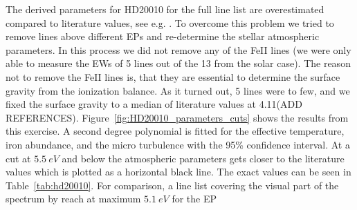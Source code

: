 \documentclass{aa}
\begin{document}
The derived parameters for HD20010 for the full line list
are overestimated compared to literature values, see e.g.
\citet{Mortier2013,Lebzelter2012}. To overcome this problem we tried
to remove lines above different EPs and re-determine the stellar
atmospheric parameters. In this process we did not remove any of the
FeII lines (we were only able to measure the EWs of 5 lines out of
the 13 from the solar case). The reason not to remove the FeII lines
is, that they are essential to determine the surface gravity from the
ionization balance. As it turned out, 5 lines were to few, and we
fixed the surface gravity to a median of literature values at 4.11(ADD
REFERENCES). Figure~\ref{fig:HD20010_parameters_cuts} shows the results
from this exercise. A second degree polynomial is fitted for the
effective temperature, iron abundance, and the micro turbulence with
the 95\% confidence interval. At a cut at $\SI{5.5}{eV}$ and below
the atmospheric parameters gets closer to the literature values which
is plotted as a horizontal black line. The exact values can be seen
in Table~\ref{tab:hd20010}. For comparison, a line list covering the
visual part of the spectrum by \cite{Tsantaki2013} reach at maximum
$\SI{5.1}{eV}$ for the EP
\end{document}
